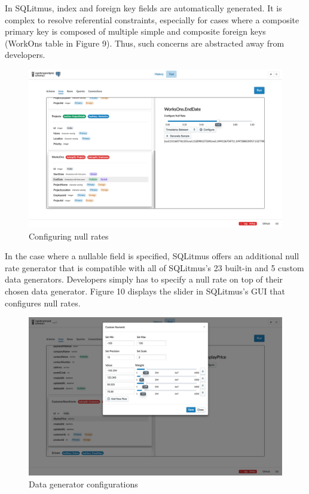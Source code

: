 \documentclass[12pt]{article}
\begin{document}
\begin{spacing}{1.9}
\begin{figure}[H]
		\end{figure}
		
		In SQLitmus, index and foreign key fields are automatically generated. It is complex to resolve referential constraints, especially for cases where a composite primary key is composed of multiple simple and composite foreign keys (WorkOns table in Figure 9). Thus, such concerns are abstracted away from developers.
		
		
		\begin{figure}[H]
			\centering
			\includegraphics[width=\textwidth]{3-2-2b.png}
			\caption{ Configuring null rates }
			
		\end{figure}
		
		In the case where a nullable field is specified, SQLitmus offers an additional null rate generator that is compatible with all of SQLitmus's 23 built-in and 5 custom data generators. Developers simply has to specify a null rate on top of their chosen data generator. Figure 10 displays the slider in SQLitmus's GUI that configures null rates.
		
		
		\begin{figure}[H]
			\centering
			\includegraphics[width=\textwidth]{3-2-2c.png}
			\caption{Data generator configurations }
			

\end{figure}
\end{spacing}
\end{document}
